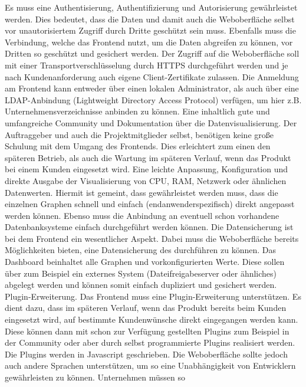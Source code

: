 \begin{outline}
  \1 Es muss eine Authentisierung, Authentifizierung und Autorisierung
  gewährleistet werden. Dies bedeutet, dass die Daten und damit auch die
  Weboberfläche selbst vor unautorisiertem Zugriff durch Dritte geschützt sein
  muss. Ebenfalls muss die Verbindung, welche das Frontend nutzt, um die Daten
  abgreifen zu können, vor Dritten so geschützt und gesichert werden. Der
  Zugriff auf die Weboberfläche soll mit einer Transportverschlüsselung durch
  \gls{HTTPS} durchgeführt werden und je nach Kundenanforderung auch eigene
  Client-Zertifikate zulassen. Die Anmeldung am Frontend kann entweder über
  einen lokalen Administrator, als auch über eine LDAP-Anbindung (Lightweight
  Directory Access Protocol) verfügen, um hier z.B. Unternehmensverzeichnisse
  anbinden zu können.
  \1 Eine inhaltlich gute und umfangreiche Community und Dokumentation über die
  Datenvisualisierung. Der Auftraggeber und auch die Projektmitglieder selbst,
  benötigen keine große Schulung mit dem Umgang des Frontends. Dies erleichtert
  zum einen den späteren Betrieb, als auch die Wartung im späteren Verlauf,
  wenn das Produkt bei einem Kunden eingesetzt wird.
  \1 Eine leichte Anpassung, Konfiguration und direkte Ausgabe der
  Visualisierung von CPU, RAM, Netzwerk oder ähnlichen Datenwerten. Hiermit ist
  gemeint, dass gewährleistet werden muss, dass die einzelnen Graphen schnell
  und einfach (endanwenderspezifisch) direkt angepasst werden können. Ebenso
  muss die Anbindung an eventuell schon vorhandene Datenbanksysteme einfach
  durchgeführt werden können.
  \1 Die Datensicherung ist bei dem Frontend ein wesentlicher Aspekt. Dabei
  muss die Weboberfläche bereits Möglichkeiten bieten, eine Datensicherung des
   durchführen zu können. Das Dashboard
  beinhaltet alle Graphen und vorkonfigurierten Werte. Diese sollen über zum
  Beispiel ein externes System (Dateifreigabeserver oder ähnliches) abgelegt
  werden und können somit einfach dupliziert und gesichert werden.
  \1 Plugin-Erweiterung. Das Frontend muss eine Plugin-Erweiterung
  unterstützen. Es dient dazu, dass im späteren Verlauf, wenn das Produkt
  bereits beim Kunden eingesetzt wird, auf bestimmte Kundenwünsche direkt
  eingegangen werden kann. Diese können dann mit schon zur Verfügung gestellten
  Plugins zum Beispiel in der Community oder aber durch selbst programmierte
  Plugins realisiert werden. Die Plugins werden in Javascript geschrieben. Die
  Weboberfläche sollte jedoch auch andere Sprachen unterstützen, um so eine
  Unabhängigkeit von Entwicklern gewährleisten zu können. Unternehmen müssen so

\end{outline}

